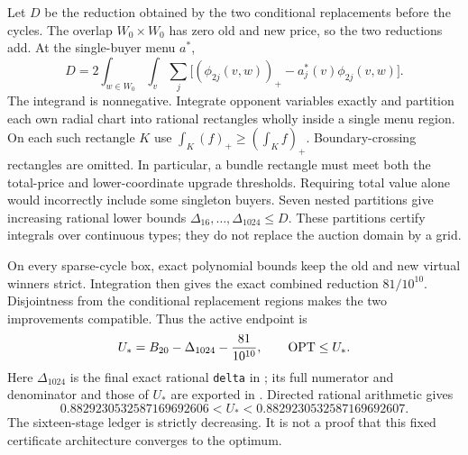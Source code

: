 Let $D$ be the reduction obtained by the two conditional replacements
before the cycles. The overlap $W_0\times W_0$ has zero old and new price,
so the two reductions add. At the single-buyer menu $a^*$,
\[
 D=2\int_{w\in W_0}\int_v\sum_j
       \big[(\phi_{2j}(v,w))_+-a_j^*(v)\phi_{2j}(v,w)\big].
\]
The integrand is nonnegative. Integrate opponent variables exactly and
partition each own radial chart into rational rectangles wholly inside a
single menu region. On each such rectangle $K$ use
$\int_K(f)_+\ge(\int_K f)_+$. Boundary-crossing rectangles are omitted.
In particular, a bundle rectangle must meet both the total-price and
lower-coordinate upgrade thresholds. Requiring total value alone would
incorrectly include some singleton buyers. Seven nested partitions give
increasing rational lower bounds $\Delta_{16},\ldots,\Delta_{1024}\le D$.
These partitions certify integrals over continuous types; they do not
replace the auction domain by a grid.

On every sparse-cycle box, exact polynomial bounds keep the old and new
virtual winners strict. Integration then gives the exact combined
reduction $81/10^{10}$. Disjointness from the conditional replacement
regions makes the two improvements compatible. Thus the active endpoint is
\begin{equation}\label{eq:common-upper-endpoint}
 U_*=B_{20}-\Delta_{1024}-\frac{81}{10^{10}},\qquad \operatorname{OPT}\le U_*.
\end{equation}
Here $\Delta_{1024}$ is the final exact rational \texttt{delta} in
;
its full numerator and denominator and those of $U_*$ are exported in
.
Directed rational arithmetic gives
\[
 0.8829230532587169692606<U_*<0.8829230532587169692607.
\]
The sixteen-stage ledger is strictly decreasing. It is not a proof that
this fixed certificate architecture converges to the optimum.

